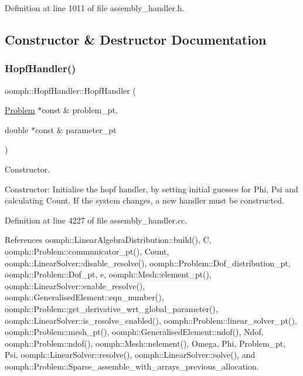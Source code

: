 Definition at line 1011 of file assembly\+\_\+handler.\+h.



\subsection{Constructor \& Destructor Documentation}
\mbox{\label{classoomph_1_1HopfHandler_ac219516b8263300eb5102d38baab05d7}} 
\subsubsection{\texorpdfstring{Hopf\+Handler()}{HopfHandler()}\hspace{0.1cm}{\footnotesize\ttfamily [1/2]}}
{\footnotesize\ttfamily oomph\+::\+Hopf\+Handler\+::\+Hopf\+Handler (\begin{DoxyParamCaption}\item[{\hyperlink{classoomph_1_1Problem}{Problem} $\ast$const \&}]{problem\+\_\+pt,  }\item[{double $\ast$const \&}]{parameter\+\_\+pt }\end{DoxyParamCaption})}



Constructor. 

Constructor\+: Initialise the hopf handler, by setting initial guesses for Phi, Psi and calculating Count. If the system changes, a new handler must be constructed. 

Definition at line 4227 of file assembly\+\_\+handler.\+cc.



References oomph\+::\+Linear\+Algebra\+Distribution\+::build(), C, oomph\+::\+Problem\+::communicator\+\_\+pt(), Count, oomph\+::\+Linear\+Solver\+::disable\+\_\+resolve(), oomph\+::\+Problem\+::\+Dof\+\_\+distribution\+\_\+pt, oomph\+::\+Problem\+::\+Dof\+\_\+pt, e, oomph\+::\+Mesh\+::element\+\_\+pt(), oomph\+::\+Linear\+Solver\+::enable\+\_\+resolve(), oomph\+::\+Generalised\+Element\+::eqn\+\_\+number(), oomph\+::\+Problem\+::get\+\_\+derivative\+\_\+wrt\+\_\+global\+\_\+parameter(), oomph\+::\+Linear\+Solver\+::is\+\_\+resolve\+\_\+enabled(), oomph\+::\+Problem\+::linear\+\_\+solver\+\_\+pt(), oomph\+::\+Problem\+::mesh\+\_\+pt(), oomph\+::\+Generalised\+Element\+::ndof(), Ndof, oomph\+::\+Problem\+::ndof(), oomph\+::\+Mesh\+::nelement(), Omega, Phi, Problem\+\_\+pt, Psi, oomph\+::\+Linear\+Solver\+::resolve(), oomph\+::\+Linear\+Solver\+::solve(), and oomph\+::\+Problem\+::\+Sparse\+\_\+assemble\+\_\+with\+\_\+arrays\+\_\+previous\+\_\+allocation.


